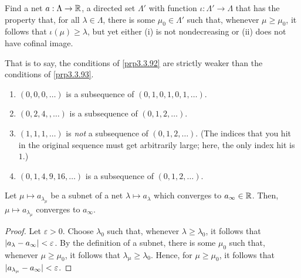 \begin{exr}\label{exr3.3.94}
Find a net $a:\Lambda \rightarrow \mathbb{R}$, a directed set $\Lambda '$ with function $\iota :\Lambda '\rightarrow \Lambda$ that has the property that, for all $\lambda \in \Lambda$, there is some $\mu _0\in \Lambda '$ such that, whenever $\mu \geq \mu_0$, it follows that $\iota (\mu )\geq \lambda$, but yet either (i) is not nondecreasing or (ii) does not have cofinal image.
\begin{rmk}
That is to say, the conditions of \cref{prp3.3.92} are strictly weaker than the conditions of \cref{prp3.3.93}.
\end{rmk}
\end{exr}

\begin{exm}
\begin{enumerate}
\item $(0,0,0,\ldots )$ is a subsequence of $(0,1,0,1,0,1,\ldots )$.
\item $(0,2,4,,\ldots )$ is a subsequence of $(0,1,2,\ldots )$.
\item $(1,1,1,\ldots )$ is \emph{not} a subsequence of $(0,1,2,\ldots )$.  (The indices that you hit in the original sequence must get arbitrarily large; here, the only index hit is $1$.)
\item $(0,1,4,9,16,\ldots )$ is a subsequence of $(0,1,2,\ldots )$.
\end{enumerate}
\end{exm}
\begin{prp}\label{prp3.3.61}
Let $\mu \mapsto a_{\lambda _\mu}$ be a subnet of a net $\lambda \mapsto a_\lambda$ which converges to $a_\infty \in \mathbb{R}$.  Then, $\mu \mapsto a_{\lambda _\mu}$ converges to $a_\infty$.
\begin{proof}
Let $\varepsilon >0$.  Choose $\lambda _0$ such that, whenever $\lambda \geq \lambda _0$, it follows that $\lvert a_\lambda -a_\infty\rvert<\varepsilon$.  By the definition of a subnet, there is some $\mu _0$ such that, whenever $\mu \geq \mu _0$, it follows that $\lambda _\mu \geq \lambda _0$.  Hence, for $\mu \geq \mu _0$, it follows that $\lvert a_{\lambda _\mu}-a_\infty\rvert<\varepsilon$.
\end{proof}
\end{prp}

